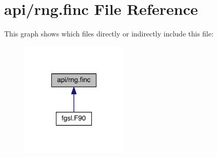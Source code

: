 \hypertarget{rng_8finc}{\section{api/rng.finc File Reference}
\label{rng_8finc}
}
This graph shows which files directly or indirectly include this file\-:
\nopagebreak
\begin{figure}[H]
\begin{center}
\leavevmode
\includegraphics[width=144pt]{rng_8finc__dep__incl}
\end{center}
\end{figure}
